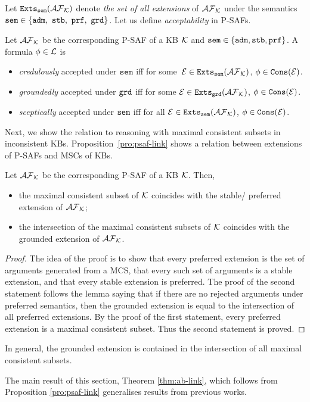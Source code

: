 Let $\texttt{\textup{Exts}}_{\texttt{\textup{sem}}}( \mathcal{AF}_{\mathcal{K}})$ denote \emph{the set of all extensions} of $ \mathcal{AF}_{\mathcal{K}}$ under the semantics $\texttt{\textup{sem}} \in \{\texttt{\textup{adm}},\ \texttt{\textup{stb}},\ \texttt{\textup{prf}},\ \texttt{\textup{grd}} \}$.
Let us define \emph{acceptability} in P-SAFs.
\begin{definition}
  \label{def:accept}
  Let $\mathcal{AF}_{\mathcal{K}}$ be the corresponding P-SAF of a KB $\mathcal{K}$ and $\texttt{\textup{sem}} \in \{\texttt{\textup{adm}}, \texttt{\textup{stb}}, \texttt{\textup{prf}} \}$. A formula $\phi \in \mathcal{L}$ is 
   \begin{itemize}

    \item \emph{credulously} accepted under $\texttt{\textup{sem}}$ iff for some~$\mathcal{E} \in \texttt{\textup{Exts}}_{\texttt{\textup{sem}}}( \mathcal{AF}_{\mathcal{K}})$, $\phi \in \texttt{\textup{Cons}}(\mathcal{E})$.
    

    \item \emph{groundedly} accepted under $\texttt{\textup{grd}}$ iff for some $\mathcal{E} \in \texttt{\textup{Exts}}_{\texttt{\textup{grd}}}( \mathcal{AF}_{\mathcal{K}})$, $\phi \in \texttt{\textup{Cons}}(\mathcal{E})$.

    \item \emph{sceptically} accepted under $\texttt{\textup{sem}}$ iff for all $\mathcal{E} \in \texttt{\textup{Exts}}_{\texttt{\textup{sem}}}( \mathcal{AF}_{\mathcal{K}})$, $\phi \in \texttt{\textup{Cons}}(\mathcal{E})$.
  \end{itemize}
  \end{definition}

Next, we show the relation to reasoning with maximal consistent subsets in inconsistent KBs.
Proposition~\ref{pro:psaf-link} shows a relation between extensions of P-SAFs and MSCs of KBs.

\begin{proposition}
\label{pro:psaf-link}
 Let $\mathcal{AF}_{\mathcal{K}}$ be the corresponding P-SAF of a KB $\mathcal{K}$. Then,

 \begin{itemize}
     \item the maximal consistent subset of $ \mathcal{K}$ coincides with the stable/ preferred extension of $\mathcal{AF}_{\mathcal{K}}$;

     \item the intersection of the maximal consistent subsets of $ \mathcal{K}$ coincides with the grounded extension of $\mathcal{AF}_{\mathcal{K}}$.
 \end{itemize}
\end{proposition}
\begin{proof} %
The idea of the proof is to show that every preferred extension is the set of arguments generated from a MCS, that every such set of arguments is a stable extension, and that every stable extension is preferred.
%
The proof of the second statement follows the lemma saying that if there are no rejected arguments under preferred semantics, then the grounded extension is equal to the intersection of all preferred extensions. By the proof of the first statement, every preferred extension is a maximal consistent subset. Thus the second statement is proved.
\end{proof}
\begin{remark}
In general, the grounded extension is contained in the intersection of all maximal consistent subsets.
\end{remark}
The main result of this section, Theorem \ref{thm:ab-link}, which follows from Proposition \ref{pro:psaf-link} generalises results from previous works. %

